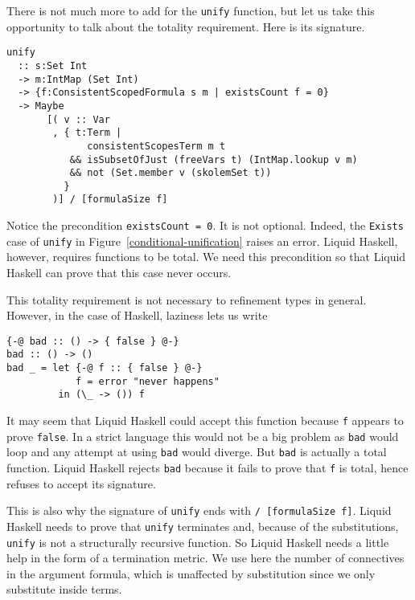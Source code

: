 \documentclass[sigconf, review]{acmart}
\newcommand{\tc}[1]{{\small\texttt{#1}}}
\begin{document}
There is not much more to add for the \tc{unify} function, but let us take this
opportunity to talk about the totality requirement. Here is its signature.

\begin{verbatim}
unify
  :: s:Set Int
  -> m:IntMap (Set Int)
  -> {f:ConsistentScopedFormula s m | existsCount f = 0}
  -> Maybe
       [( v :: Var
        , { t:Term |
              consistentScopesTerm m t
           && isSubsetOfJust (freeVars t) (IntMap.lookup v m)
           && not (Set.member v (skolemSet t))
          }
        )] / [formulaSize f]
\end{verbatim}

Notice the precondition \tc{existsCount = 0}. It is not optional. Indeed, the
\tc{Exists} case of \tc{unify} in Figure~\ref{conditional-unification} raises an
error. Liquid Haskell, however, requires functions to be total. We need this
precondition so that Liquid Haskell can prove that this case never occurs.

This totality requirement is not necessary to refinement types in general.
However, in the case of Haskell, laziness lets us write
\begin{verbatim}
{-@ bad :: () -> { false } @-}
bad :: () -> ()
bad _ = let {-@ f :: { false } @-}
            f = error "never happens"
         in (\_ -> ()) f
\end{verbatim}
It may seem that Liquid Haskell could accept this function because \tc{f} appears
to prove \tc{false}. In a strict language this would not be a big problem as
\tc{bad} would loop and any attempt at using \tc{bad} would diverge. But \tc{bad} is
actually a total function. Liquid Haskell rejects \tc{bad} because it fails to
prove that \tc{f} is total, hence refuses to accept its signature.

This is also why the signature of \tc{unify} ends with \tc{/ [formulaSize f]}.
Liquid Haskell needs to prove that \tc{unify} terminates and, because of the
substitutions, \tc{unify} is not a structurally recursive function. So Liquid
Haskell needs a little help in the form of a termination metric. We use here
the number of connectives in the argument formula, which is unaffected by
substitution since we only substitute inside terms.

\end{document}
